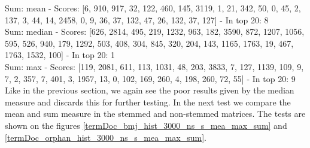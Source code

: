 {\small
Sum: mean - Scores: [6, 910, 917, 32, 122, 460, 145, 3119, 1, 21, 342, 50, 0, 45, 2, 137, 3, 44, 14, 2458, 0, 9, 36, 37, 132, 47, 26, 132, 37, 127] - In top 20: 8 \\
Sum: median - Scores: [626, 2814, 495, 219, 1232, 963, 182, 3590, 872, 1207, 1056, 595, 526, 940, 179, 1292, 503, 408, 304, 845, 320, 204, 143, 1165, 1763, 19, 467, 1763, 1532, 100] - In top 20: 1 \\
Sum: max - Scores: [119, 2081, 611, 113, 1031, 48, 203, 3833, 7, 127, 1139, 109, 9, 7, 2, 357, 7, 401, 3, 1957, 13, 0, 102, 169, 260, 4, 198, 260, 72, 55] - In top 20: 9 \\
}
Like in the previous section, we again see the poor results given by the median measure and discards this for further testing. In the next test we compare the mean and sum measure in the stemmed and non-stemmed matrices. The tests are shown on the figures \ref{termDoc_bmj_hist_3000_ns_s_mea_max_sum} and \ref{termDoc_orphan_hist_3000_ns_s_mea_max_sum}.

